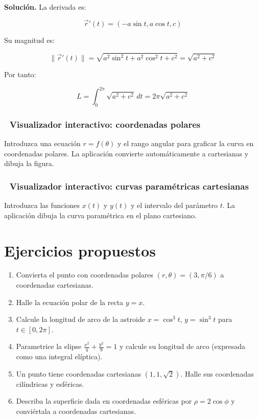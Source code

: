 \documentclass[
]{book}
\providecommand{\tightlist}{%
  \setlength{\itemsep}{0pt}\setlength{\parskip}{0pt}}
\begin{document}
\textbf{Solución.} La derivada es:

\[
\vec{r}'(t) = (-a\sin t, a\cos t, c)
\]

Su magnitud es:

\[
\|\vec{r}'(t)\| = \sqrt{a^2\sin^2 t + a^2\cos^2 t + c^2} = \sqrt{a^2 + c^2}
\]

Por tanto:

\[
L = \int_0^{2\pi} \sqrt{a^2 + c^2} \, dt = 2\pi\sqrt{a^2 + c^2}
\]

\subsubsection{🧮 Visualizador interactivo: coordenadas polares}\label{visualizador-interactivo-coordenadas-polares}

Introduzca una ecuación \(r = f(\theta)\) y el rango angular para graficar la curva en coordenadas polares. La aplicación convierte automáticamente a cartesianas y dibuja la figura.

\subsubsection{🧮 Visualizador interactivo: curvas paramétricas cartesianas}\label{visualizador-interactivo-curvas-paramuxe9tricas-cartesianas}

Introduzca las funciones \(x(t)\) y \(y(t)\) y el intervalo del parámetro \(t\). La aplicación dibuja la curva paramétrica en el plano cartesiano.

\section{Ejercicios propuestos}\label{ejercicios-propuestos-2}

\begin{enumerate}
\def\labelenumi{\arabic{enumi}.}
\tightlist
\item
  Convierta el punto con coordenadas polares \((r, \theta) = (3, \pi/6)\) a coordenadas cartesianas.
\item
  Halle la ecuación polar de la recta \(y = x\).
\item
  Calcule la longitud de arco de la astroide \(x = \cos^3 t\), \(y = \sin^3 t\) para \(t \in [0, 2\pi]\).
\item
  Parametrice la elipse \(\frac{x^2}{4} + \frac{y^2}{9} = 1\) y calcule su longitud de arco (expresada como una integral elíptica).
\item
  Un punto tiene coordenadas cartesianas \((1, 1, \sqrt{2})\). Halle sus coordenadas cilíndricas y esféricas.
\item
  Describa la superficie dada en coordenadas esféricas por \(\rho = 2\cos\phi\) y conviértala a coordenadas cartesianas.
\end{enumerate}
\end{document}
